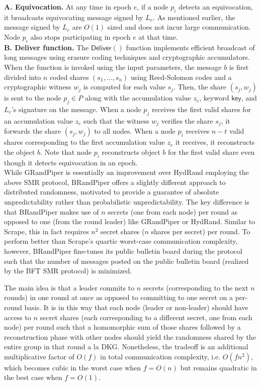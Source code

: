 \documentclass[letterpaper,twocolumn,10pt]{article}
\theoremstyle{definition}
\theoremstyle{remark}
\begin{document}
\textbf{A. Equivocation.} At any time in epoch $e$, if a node $p_i$ detects an equivocation, it broadcasts equivocating message signed by $L_e$. As mentioned earlier, the message signed by $L_e$ are $O(1)$ sized and does not incur large communication. Node $p_i$ also stops participating in epoch $e$ at that time.\\

\textbf{B. Deliver function.} The $\mathsf{Deliver}()$ function implements efficient broadcast of long messages using erasure coding techniques and cryptographic accumulators. When the function is invoked using the input parameters, the message $b$ is first divided into $n$ coded shares $(s_1, ..., s_n)$ using Reed-Solomon codes and a cryptographic witness $w_j$ is computed for each value $s_j$. Then, the share $(s_j, w_j)$ is sent to the node $p_j \in P$ along with the accumulation value $z_e$, keyword $\mathsf{key}$, and $L_e$'s signature on the message. When a node $p_j$ receives the first valid shares for an accumulation value $z_e$ such that the witness $w_j$ verifies the share $s_j$, it forwards the share $(s_j, w_j)$ to all nodes. When a node $p_i$ receives $n - t$ valid shares corresponding to the first accumulation value $z_e$ it receives, it reconstructs the object $b$. Note that node $p_i$ reconstructs object $b$ for the first valid share even though it detects equivocation in an epoch.\\

While GRandPiper is essentially an improvement over HydRand employing the above SMR protocol, BRandPiper offers a slightly different approach to distributed randomness, motivated to provide a guarantee of absolute unpredictability rather than probabilistic unpredictability. The key difference is that BRandPiper makes use of $n$ secrets (one from each node) per round as opposed to one (from the round leader) like GRandPiper or HydRand. Similar to Scrape, this in fact requires $n^2$ secret shares ($n$ shares per secret) per round. To perform better than Scrape's quartic worst-case communication complexity, however, BRandPiper fine-tunes its public bulletin board during the protocol such that the number of messages posted on the public bulletin board (realized by the BFT SMR protocol) is minimized.

The main idea is that a leader commits to $n$ secrets (corresponding to the next $n$ rounds) in one round at once as opposed to committing to one secret on a per-round basis. It is in this way that each node (leader or non-leader) should have access to $n$ secret shares (each corresponding to a different secret, one from each node) per round such that a homomorphic sum of those shares followed by a reconstruction phase with other nodes should yield the randomness shared by the entire group in that round a la DKG. Nonetheless, the tradeoff is an additional multiplicative factor of $O(f)$ in total communication complexity, i.e. $O(f n^2)$, which becomes cubic in the worst case when $f = O(n)$ but remains quadratic in the best case when $f = O(1)$.
\end{document}

